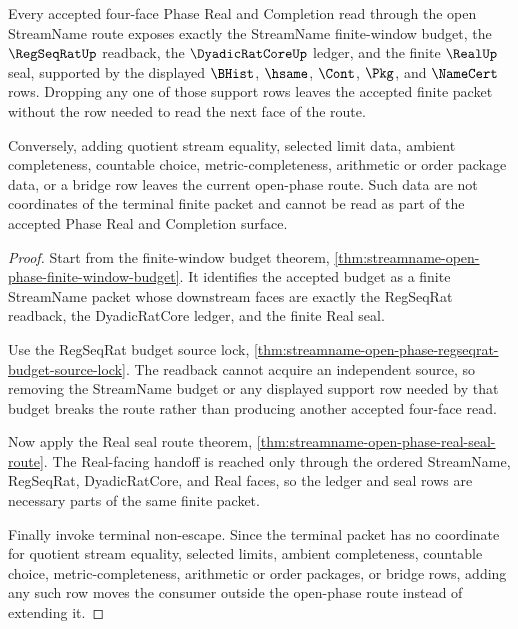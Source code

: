 \begin{theorem}
\label{thm:streamname-open-phase-finite-window-support-row-minimality}
Every accepted four-face Phase Real and Completion read through the open StreamName route exposes exactly the StreamName finite-window budget, the $\RegSeqRatUp$ readback, the $\DyadicRatCoreUp$ ledger, and the finite $\RealUp$ seal, supported by the displayed $\BHist$, $\hsame$, $\Cont$, $\Pkg$, and $\NameCert$ rows. Dropping any one of those support rows leaves the accepted finite packet without the row needed to read the next face of the route.

Conversely, adding quotient stream equality, selected limit data, ambient completeness, countable choice, metric-completeness, arithmetic or order package data, or a bridge row leaves the current open-phase route. Such data are not coordinates of the terminal finite packet and cannot be read as part of the accepted Phase Real and Completion surface.
\end{theorem}
\begin{proof}
Start from the finite-window budget theorem, \autoref{thm:streamname-open-phase-finite-window-budget}. It identifies the accepted budget as a finite StreamName packet whose downstream faces are exactly the RegSeqRat readback, the DyadicRatCore ledger, and the finite Real seal.

Use the RegSeqRat budget source lock, \autoref{thm:streamname-open-phase-regseqrat-budget-source-lock}. The readback cannot acquire an independent source, so removing the StreamName budget or any displayed support row needed by that budget breaks the route rather than producing another accepted four-face read.

Now apply the Real seal route theorem, \autoref{thm:streamname-open-phase-real-seal-route}. The Real-facing handoff is reached only through the ordered StreamName, RegSeqRat, DyadicRatCore, and Real faces, so the ledger and seal rows are necessary parts of the same finite packet.

Finally invoke terminal non-escape. Since the terminal packet has no coordinate for quotient stream equality, selected limits, ambient completeness, countable choice, metric-completeness, arithmetic or order packages, or bridge rows, adding any such row moves the consumer outside the open-phase route instead of extending it.
\end{proof}

